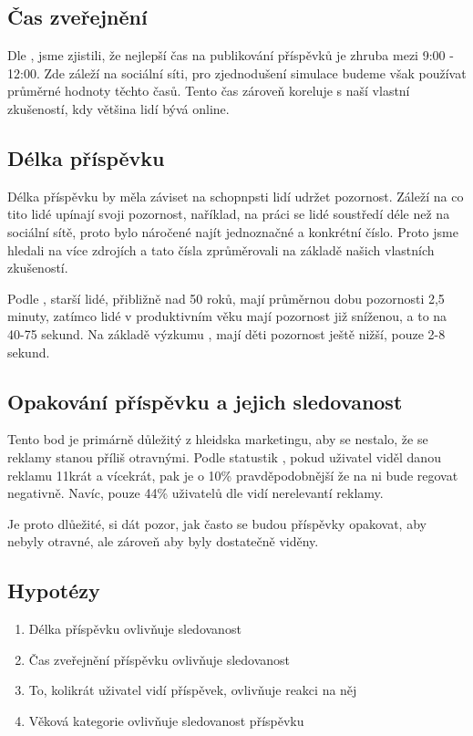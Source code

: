 \documentclass[11pt, a4paper]{article}
\begin{document}
\subsection{Čas zveřejnění}
Dle \cite{TimeToPost}, jsme zjistili, že nejlepší čas na publikování příspěvků je zhruba mezi 9:00 - 12:00. Zde záleží na sociální síti, 
pro zjednodušení simulace budeme však používat průměrné hodnoty těchto časů.
Tento čas zároveň koreluje s naší vlastní zkušeností, kdy většina lidí bývá online.

\subsection{Délka příspěvku}
Délka příspěvku by měla záviset na schopnpsti lidí udržet pozornost. Záleží na co tito lidé upínají svoji pozornost,
naříklad, na práci se lidé soustředí déle než na sociální sítě, proto bylo náročené najít jednoznačné a konkrétní číslo.
Proto jsme hledali na více zdrojích a tato čísla zprůměrovali na základě našich vlastních zkušeností.

Podle \cite{AttentionSpan1}, starší lidé, přibližně nad 50 roků, mají průměrnou dobu pozornosti 2,5 minuty, zatímco lidé v produktivním věku mají pozornost již sníženou, a to na 40-75 sekund.
Na základě výzkumu \cite{AttentionSpan2}, mají děti pozornost ještě nižší, pouze 2-8 sekund.

\subsection{Opakování příspěvku a jejich sledovanost}
Tento bod je primárně důležitý z hleidska marketingu, aby se nestalo, že se reklamy stanou příliš otravnými.
Podle statustik \cite{SocialMediaAds}, pokud uživatel viděl danou reklamu 11krát a vícekrát, pak je o 10\% pravděpodobnější že na ni bude regovat negativně.
Navíc, pouze 44\% uživatelů dle \cite{SocialMediaAds-44} vidí nerelevantí reklamy. 

Je proto dlůežité, si dát pozor, jak často se budou příspěvky opakovat, aby nebyly otravné, ale zároveň aby byly dostatečně viděny.




\subsection{Hypotézy}
\begin{enumerate}
    \item Délka příspěvku ovlivňuje sledovanost
    \item Čas zveřejnění příspěvku ovlivňuje sledovanost
    \item To, kolikrát uživatel vidí příspěvek, ovlivňuje reakci na něj
    \item Věková kategorie ovlivňuje sledovanost příspěvku
\end{enumerate}
\end{document}
